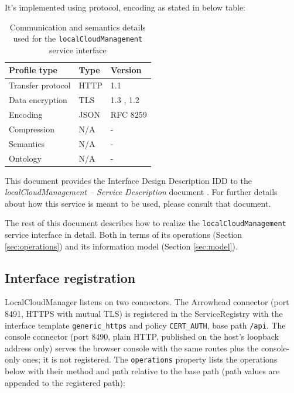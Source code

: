 \documentclass[a4paper]{arrowhead}
\begin{document}
It's implemented using protocol, encoding as stated in below table:
\begin{table}[ht!]
  \centering
  \begin{tabular}{|l|l|l|}
    \hline
    \rowcolor{gray!33} Profile type & Type & Version \\ \hline
    Transfer protocol & HTTP & 1.1 \cite{rfc9112} \\ \hline
    Data encryption & TLS & 1.3 \cite{rfc8446}, 1.2 \cite{rfc5246} \\ \hline
    Encoding & JSON & RFC 8259 \cite{rfc8259} \\ \hline
    Compression & N/A & - \\ \hline
    Semantics & N/A & - \\ \hline
    Ontology & N/A & - \\ \hline
  \end{tabular}
  \caption{Communication and semantics details used for the \texttt{local\allowbreak{}Cloud\allowbreak{}Management} service interface}
  \label{tab:comunication_semantics_profile}
\end{table}

This document provides the Interface Design Description IDD to the \textit{localCloudManagement -- Service Description} document \cite{lcm-localCloudManagement-sd}.
For further details about how this service is meant to be used, please consult that document.

The rest of this document describes how to realize the \texttt{local\allowbreak{}Cloud\allowbreak{}Management} service
interface in detail. Both in terms of its operations (Section \ref{sec:operations}) and its information model (Section \ref{sec:model}).

\subsection{Interface registration}

LocalCloudManager listens on two connectors. The Arrowhead connector (port 8491, HTTPS with mutual TLS) is registered in the ServiceRegistry with the interface template \texttt{generic\_\allowbreak{}https} and policy \texttt{CERT\_\allowbreak{}AUTH}, base path \texttt{/\allowbreak{}api}. The console connector (port 8490, plain HTTP, published on the host's loopback address only) serves the browser console with the same routes plus the console-only ones; it is not registered. The \texttt{operations} property lists the operations below with their method and path relative to the base path (path values are appended to the registered path):
\end{document}
